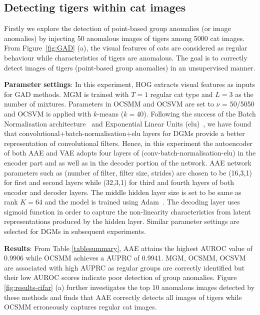 \subsection{Detecting tigers within cat images }
\label{sec:tigerDetect}
Firstly we explore the detection of point-based group anomalies (or image anomalies) by injecting 50 anomalous images of tigers among 5000 cat images.
From Figure~\ref{fig:GAD} (a), the visual features of cats are considered as regular behaviour while  characteristics of tigers are anomalous. The goal is to correctly detect images of tigers (point-based group anomalies) in an unsupervised manner.

\textbf{Parameter settings}:
In this experiment, HOG extracts visual features as inputs for GAD methods. MGM is trained with $T=1$ regular cat type and $L=3$ as the number of mixtures. Parameters in OCSMM and OCSVM are set to  $\nu$ = 50/5050 and OCSVM is applied with $k$-means ($k=40$). Following the success of the Batch Normalisation architecture~\cite{ioffe2015batch} and Exponential Linear Units (elu)~\cite{clevert2015fast}, we have found that convolutional+batch-normalisation+elu layers for DGMs provide a better representation of convolutional filters. Hence, in this experiment the autoencoder of both AAE and VAE adopts four layers of (conv-batch-normalisation-elu) in the encoder part and as well as in the decoder portion of the network. AAE network parameters such as (number of filter, filter size, strides) are chosen to be (16,3,1) for first and second layers while (32,3,1) for third and fourth layers of both encoder and decoder layers. The middle hidden layer size is set to be same as rank $K = 64$ and the model is trained using Adam~\cite{kingma2014adam}. The decoding layer uses sigmoid function in order to capture the non-linearity characteristics from  latent representations produced by the hidden layer.  Similar parameter settings are selected for DGMs in subsequent experiments.


{
\textbf{Results}:
From Table  \ref{tablesummary}, AAE attains the highest AUROC value of 0.9906 while OCSMM achieves a AUPRC of 0.9941. MGM, OCSMM, OCSVM are associated with high AUPRC as  regular groups are correctly identified but their low AUROC scores indicate poor detection of group anomalies. Figure  \ref{fig:results-cifar} (a) further investigates the top 10 anomalous images detected by these methods and finds that AAE correctly detects all images of tigers while OCSMM erroneously captures regular cat images.
}


